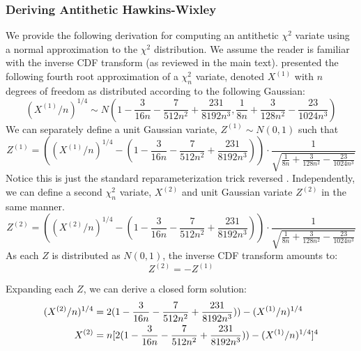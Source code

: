 \subsubsection{Deriving Antithetic Hawkins-Wixley}

We provide the following derivation for computing an antithetic $\chi^2$ variate using a normal approximation to the $\chi^2$ distribution. We assume the reader is familiar with the inverse CDF transform (as reviewed in the main text). \cite{hawkins1986note} presented the following fourth root approximation of a $\chi^2_n$ variate, denoted $X^{(1)}$ with $n$ degrees of freedom as distributed according to the following Gaussian:
\begin{equation}
    (X^{(1)}/n)^{1/4} \sim N(1 - \frac{3}{16n} - \frac{7}{512n^2} + \frac{231}{8192n^3}, \frac{1}{8n} + \frac{3}{128n^2} - \frac{23}{1024n^3})
\end{equation}
We can separately define a unit Gaussian variate, $Z^{(1)} \sim N(0, 1)$ such that
\begin{equation}
    Z^{(1)} = ((X^{(1)}/n)^{1/4} - (1 - \frac{3}{16n} - \frac{7}{512n^2} + \frac{231}{8192n^3})) \cdot \frac{1}{\sqrt{\frac{1}{8n} + \frac{3}{128n^2} - \frac{23}{1024n^3}}}
\end{equation}
Notice this is just the standard reparameterization trick reversed \cite{rezende2014stochastic}.
Independently, we can define a second $\chi^2_n$ variate, $X^{(2)}$ and unit Gaussian variate $Z^{(2)}$ in the same manner.
\begin{equation}
    Z^{(2)} = ((X^{(2)}/n)^{1/4} - (1 - \frac{3}{16n} - \frac{7}{512n^2} + \frac{231}{8192n^3})) \cdot \frac{1}{\sqrt{\frac{1}{8n} + \frac{3}{128n^2} - \frac{23}{1024n^3}}}
\end{equation}
As each $Z$ is distributed as $N(0, 1)$, the inverse CDF transform amounts to:
\begin{equation}
    Z^{(2)} = -Z^{(1)}
\end{equation}

Expanding each $Z$, we can derive a closed form solution:
\begin{align*}
    \small
    (X^{(2)}/n)^{1/4} &= 2(1 - \frac{3}{16n} - \frac{7}{512n^2} + \frac{231}{8192n^3})) - (X^{(1)}/n)^{1/4} \\
    X^{(2)} &= n[2(1 - \frac{3}{16n} - \frac{7}{512n^2} + \frac{231}{8192n^3})) - (X^{(1)}/n)^{1/4}]^4
\end{align*}

